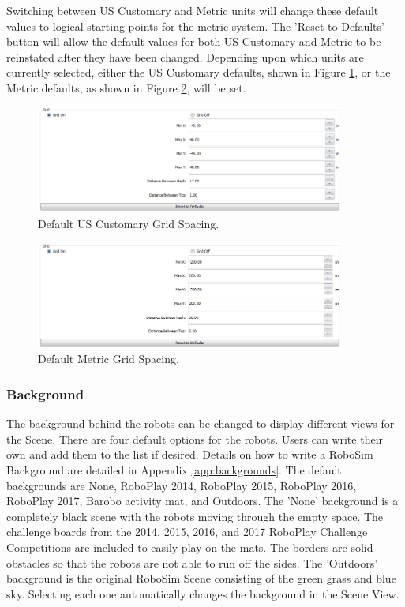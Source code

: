 \documentclass{article}
\begin{document}
Switching between US Customary and Metric units will change these default values
to logical starting points for the metric system.  The 'Reset to Defaults'
button will allow the default values for both US Customary and Metric to be
reinstated after they have been changed.  Depending upon which units are
currently selected, either the US Customary defaults, shown in Figure
\ref{fig:grid_us}, or the Metric defaults, as shown in Figure
\ref{fig:grid_metric}, will be set.
\begin{figure}[H]
	\begin{center}
		\includegraphics[width=4in]{pictures/gui_grid_us}
	\end{center}
	\caption{Default US Customary Grid Spacing.}
	\label{fig:grid_us}
\end{figure}
\begin{figure}[H]
	\begin{center}
		\includegraphics[width=4in]{pictures/gui_grid_si}
	\end{center}
	\caption{Default Metric Grid Spacing.}
	\label{fig:grid_metric}
\end{figure}

\subsubsection{Background}
The background behind the robots can be changed to display different views for
the Scene.  There are four default options for the robots.  Users can write
their own and add them to the list if desired.  Details on how to write a
RoboSim Background are detailed in Appendix \ref{app:backgrounds}.  The default
backgrounds are None, RoboPlay 2014, RoboPlay 2015, RoboPlay 2016, RoboPlay
2017, Barobo activity mat, and Outdoors.  The 'None' background is a completely
black scene with the robots moving through the empty space.  The challenge
boards from the 2014, 2015, 2016, and 2017 RoboPlay Challenge Competitions are
included to easily play on the mats.  The borders are solid obstacles so that
the robots are not able to run off the sides.  The 'Outdoors' background is the
original RoboSim Scene consisting of the green grass and blue sky.  Selecting
each one automatically changes the background in the Scene View.
\end{document}
